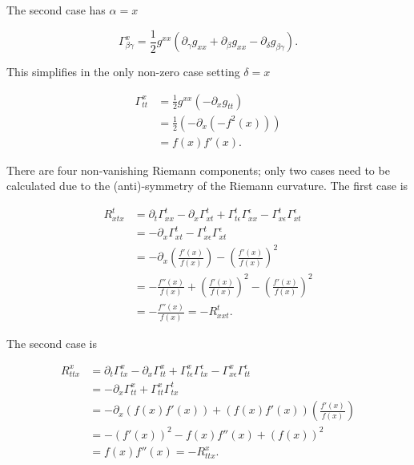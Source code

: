 \documentclass[11pt]{article}
\begin{document}
The second case has $\alpha = x$

\begin{equation}
    \label{christ-awful-x-f}
    \Gamma^{x}_{\beta \gamma} = \frac{1}{2} g^{x x} \left( \partial_{\gamma} g_{x x} + \partial_{\beta} g_{x x} - \partial_{\delta} g_{\beta \gamma}\right).
\end{equation}

This simplifies in the only non-zero case setting $\delta = x$

\begin{equation}
    \label{christ-awful-x-f2}
    \begin{split}
    \Gamma^{x}_{t t} & = \frac{1}{2} g^{xx} \left( - \partial_{x} g_{t t}\right) \\
    & = \frac{1}{2} (-\partial_{x} (-f^2(x))) \\
    & = f(x) f'(x).
    \end{split}
\end{equation}

There are four non-vanishing Riemann components; only two cases need to be calculated due to the (anti)-symmetry of the Riemann curvature. The first case is

\begin{equation}
    \label{Riemmann-curv-formula-f-txtx}
    \begin{split}
    R^{t} _{x t x} & = \partial_{t} \Gamma^{t}_{x x} - \partial_{x} \Gamma^{t}_{x t} + \Gamma^{t}_{t \epsilon} \Gamma^{\epsilon}_{x x} - \Gamma^{t}_{x \epsilon} \Gamma^{\epsilon}_{x t} \\
    & = -\partial_{x} \Gamma^{t}_{x t} - \Gamma^{t}_{x \epsilon} \Gamma^{\epsilon}_{x t} \\
    & = -\partial_{x} \left( \frac{f'(x)}{f(x)} \right) - \left( \frac{f'(x)}{f(x)} \right)^2 \\ 
    & = -\frac{f''(x)}{f(x)} + \left( \frac{f'(x)}{f(x)} \right)^2 - \left( \frac{f'(x)}{f(x)} \right)^2 \\
    & = -\frac{f''(x)}{f(x)} = - R^{t} _{x x t}.
    \end{split}
\end{equation}

The second case is

\begin{equation}
    \label{Riemmann-curv-formula-f-xttx}
    \begin{split}
    R^{x} _{t t x} & = \partial_{t} \Gamma^{x}_{t x} - \partial_{x} \Gamma^{x}_{t t} + \Gamma^{x}_{t \epsilon} \Gamma^{\epsilon}_{t x} - \Gamma^{x}_{x \epsilon} \Gamma^{\epsilon}_{t t} \\
    & = -\partial_{x} \Gamma^{x}_{t t} + \Gamma^{x}_{t t} \Gamma^{t}_{t x} \\
    & = -\partial_{x} (f(x) f'(x)) + (f(x) f'(x)) \left( \frac{f'(x)}{f(x)} \right) \\ 
    & = -(f'(x))^2 - f(x) f''(x) + (f(x))^2 \\
    & = f(x) f''(x) = - R^{x} _{t t x}.
    \end{split}
\end{equation}
\end{document}
